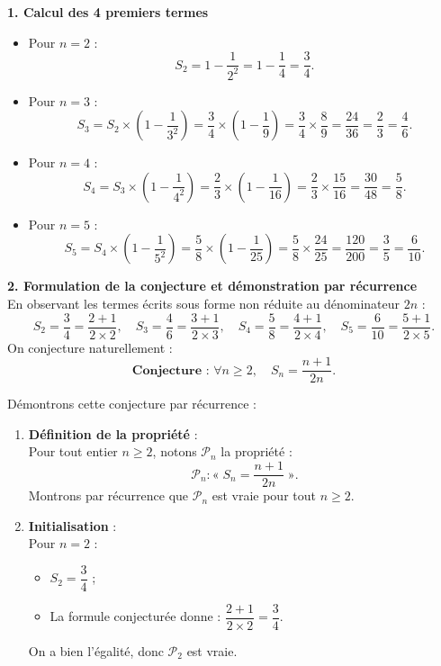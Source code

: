 \documentclass[11pt,a4paper]{article}
\begin{document}
\begin{correctionbox}
\textbf{1. Calcul des 4 premiers termes}
\begin{itemize}
    \item Pour $n = 2$ :
    \[
    S_2 = 1 - \frac{1}{2^2} = 1 - \frac{1}{4} = \frac{3}{4}.
    \]
    \item Pour $n = 3$ :
    \[
    S_3 = S_2 \times \left(1 - \frac{1}{3^2}\right) = \frac{3}{4} \times \left(1 - \frac{1}{9}\right) = \frac{3}{4} \times \frac{8}{9} = \frac{24}{36} = \frac{2}{3} = \frac{4}{6}.
    \]
    \item Pour $n = 4$ :
    \[
    S_4 = S_3 \times \left(1 - \frac{1}{4^2}\right) = \frac{2}{3} \times \left(1 - \frac{1}{16}\right) = \frac{2}{3} \times \frac{15}{16} = \frac{30}{48} = \frac{5}{8}.
    \]
    \item Pour $n = 5$ :
    \[
    S_5 = S_4 \times \left(1 - \frac{1}{5^2}\right) = \frac{5}{8} \times \left(1 - \frac{1}{25}\right) = \frac{5}{8} \times \frac{24}{25} = \frac{120}{200} = \frac{3}{5} = \frac{6}{10}.
    \]
\end{itemize}

\textbf{2. Formulation de la conjecture et démonstration par récurrence}\\
En observant les termes écrits sous forme non réduite au dénominateur $2n$ :
\[
S_2 = \frac{3}{4} = \frac{2+1}{2 \times 2}, \quad S_3 = \frac{4}{6} = \frac{3+1}{2 \times 3}, \quad S_4 = \frac{5}{8} = \frac{4+1}{2 \times 4}, \quad S_5 = \frac{6}{10} = \frac{5+1}{2 \times 5}.
\]
On conjecture naturellement :
\[
\textbf{Conjecture : } \forall n \ge 2, \quad S_n = \frac{n+1}{2n}.
\]

Démontrons cette conjecture par récurrence :
\begin{enumerate}[label=\textbf{\arabic*.}]
    \item \textbf{Définition de la propriété} :\\
    Pour tout entier $n \ge 2$, notons $\mathcal{P}_n$ la propriété :
    \[
    \mathcal{P}_n : « \; S_n = \frac{n+1}{2n} \; ».
    \]
    Montrons par récurrence que $\mathcal{P}_n$ est vraie pour tout $n \ge 2$.

    \item \textbf{Initialisation} :\\
    Pour $n = 2$ :
    \begin{itemize}
        \item $S_2 = \dfrac{3}{4}$ ;
        \item La formule conjecturée donne : $\dfrac{2+1}{2 \times 2} = \dfrac{3}{4}$.
    \end{itemize}
    On a bien l'égalité, donc $\mathcal{P}_2$ est vraie.


\end{enumerate}
\end{correctionbox}
\end{document}
